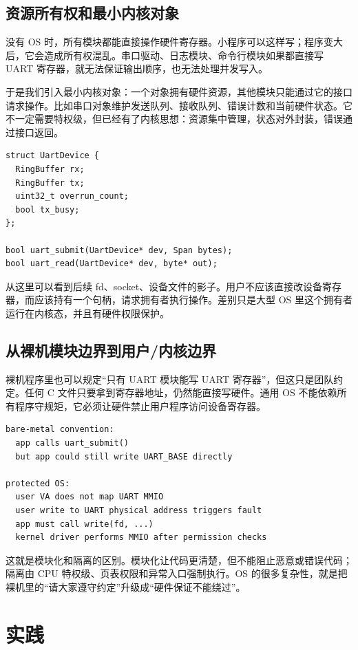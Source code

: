 \subsection{资源所有权和最小内核对象}

没有 OS 时，所有模块都能直接操作硬件寄存器。小程序可以这样写；程序变大后，它会造成所有权混乱。串口驱动、日志模块、命令行模块如果都直接写 UART 寄存器，就无法保证输出顺序，也无法处理并发写入。

于是我们引入最小内核对象：一个对象拥有硬件资源，其他模块只能通过它的接口请求操作。比如串口对象维护发送队列、接收队列、错误计数和当前硬件状态。它不一定需要特权级，但已经有了内核思想：资源集中管理，状态对外封装，错误通过接口返回。

\begin{lstlisting}
struct UartDevice {
  RingBuffer rx;
  RingBuffer tx;
  uint32_t overrun_count;
  bool tx_busy;
};

bool uart_submit(UartDevice* dev, Span bytes);
bool uart_read(UartDevice* dev, byte* out);
\end{lstlisting}

从这里可以看到后续 fd、socket、设备文件的影子。用户不应该直接改设备寄存器，而应该持有一个句柄，请求拥有者执行操作。差别只是大型 OS 里这个拥有者运行在内核态，并且有硬件权限保护。

\subsection{从裸机模块边界到用户/内核边界}

裸机程序里也可以规定“只有 UART 模块能写 UART 寄存器”，但这只是团队约定。任何 C 文件只要拿到寄存器地址，仍然能直接写硬件。通用 OS 不能依赖所有程序守规矩，它必须让硬件禁止用户程序访问设备寄存器。

\begin{lstlisting}
bare-metal convention:
  app calls uart_submit()
  but app could still write UART_BASE directly

protected OS:
  user VA does not map UART MMIO
  user write to UART physical address triggers fault
  app must call write(fd, ...)
  kernel driver performs MMIO after permission checks
\end{lstlisting}

这就是模块化和隔离的区别。模块化让代码更清楚，但不能阻止恶意或错误代码；隔离由 CPU 特权级、页表权限和异常入口强制执行。OS 的很多复杂性，就是把裸机里的“请大家遵守约定”升级成“硬件保证不能绕过”。

\section{实践}

